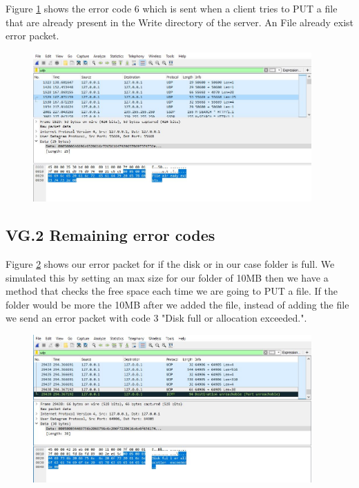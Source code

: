 \documentclass[a4paper,12pt]{article}
\numberwithin{figure}{section}
\begin{document}
\noindent Figure \ref{error 6} shows the error code 6 which is sent when a client tries to PUT a file that are already present in the Write directory of the server. An File already exist error packet.
 
\begin{figure}[h!]
	\centering
	\includegraphics[width=0.95\textwidth,keepaspectratio]{img/error6.jpg} 
	\caption{}
	\label{error 6}
\end{figure}

\newpage

\subsection{VG.2 Remaining error codes}

\noindent Figure \ref{error 3} shows our error packet for if the disk or in our case folder is full. We simulated this by setting an max size for our folder of 10MB then we have a method that checks the free space each time we are going to PUT a file. If the folder would be more the 10MB after we added the file, instead of adding the file we send an error packet with code 3 "Disk full or allocation exceeded."\cite{RFC1350}.

\begin{figure}[h!]
	\centering
	\includegraphics[width=0.95\textwidth,keepaspectratio]{img/error3.jpg} 
	\caption{}
	\label{error 3}
\end{figure}
\end{document}
